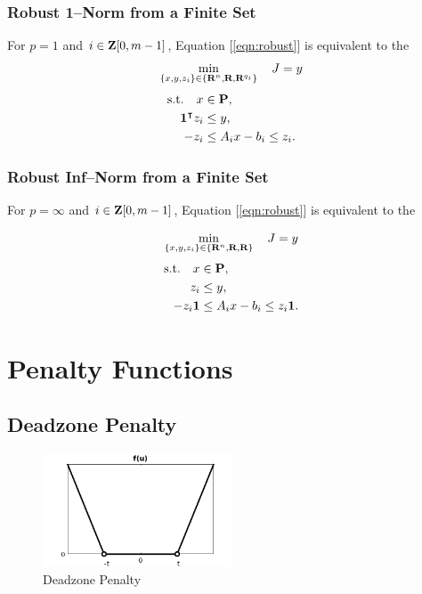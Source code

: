\documentclass{article}
\begin{document}
\subsubsection{Robust 1--Norm from a Finite Set}

        For $p=1$ and $i\in\textbf{Z}[0,m-1]$, Equation [\ref{eqn:robust}] is equivalent to the \LP
        \begin{align*}
            \min_{\{x,y,z_i\}\in\{\textbf{R}^n,\textbf{R},\textbf{R}^{q_i}\}} \quad J =y
        \end{align*}
        \begin{align*}
            \text{s.t.}\quad x&\in\textbf{P},\\
            \textbf{1}^\intercal z_i&\leq y,\\
            -z_i&\leq A_ix-b_i\leq z_i.
        \end{align*}

\subsubsection{Robust Inf--Norm from a Finite Set}

        For $p=\infty$ and $i\in\textbf{Z}[0,m-1]$, Equation [\ref{eqn:robust}] is equivalent to the \LP

        \begin{align*}
            \min_{\{x,y,z_i\}\in\{\textbf{R}^n,\textbf{R},\textbf{R}\}} \quad J =y
        \end{align*}
        \begin{align*}
            \text{s.t.}\quad x&\in\textbf{P},\\
            z_i&\leq y,\\
            -z_i\textbf{1} &\leq A_ix-b_i\leq z_i\textbf{1}.
        \end{align*}


    \clearpage

\section{Penalty Functions}

    \subsection{Deadzone Penalty} 

    \begin{figure}[h!]
        \centering
        \includegraphics[width=0.5\textwidth]{./figs/norm/deadzone.png}
        \caption{Deadzone Penalty}
        \label{fig:deadzone}
    \end{figure}
\end{document}
